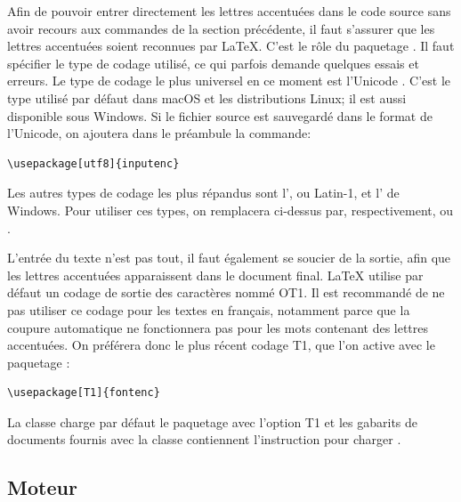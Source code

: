 {Afin de pouvoir entrer directement les lettres accentuées dans le code
source sans avoir recours aux commandes de la section précédente, il
faut s'assurer que les lettres accentuées soient reconnues par
{\LaTeX}. C'est le rôle du paquetage  \citep{inputenc}.
Il faut spécifier le type de codage utilisé, ce qui parfois demande
quelques essais et erreurs. Le type de codage le plus universel en ce
moment est l'Unicode \citep{Unicode:5.0}. C'est le type utilisé par
défaut dans macOS et les distributions Linux; il est aussi
disponible sous Windows. Si le fichier source est sauvegardé dans le
format %
de l'Unicode, on ajoutera dans le préambule la commande:
\begin{lstlisting}
\usepackage[utf8]{inputenc}
\end{lstlisting}

Les autres types de codage les plus répandus sont
l', ou
Latin-1, et l'
de Windows. Pour utiliser ces types, on remplacera 
ci-dessus par, respectivement,  ou .

L'entrée du texte n'est pas tout, il faut également se soucier de la
sortie, afin que les lettres accentuées apparaissent dans le document
final. {\LaTeX} utilise par défaut un codage de sortie des caractères
nommé OT1. Il est recommandé de ne pas utiliser ce codage pour les
textes en français, notamment parce que la coupure automatique ne
fonctionnera pas pour les mots contenant des lettres accentuées. On
préférera donc le plus récent codage T1, que l'on active avec le
paquetage  \citep{fontenc}:
\begin{lstlisting}
\usepackage[T1]{fontenc}
\end{lstlisting}

La classe  charge par défaut le paquetage 
avec l'option T1 et les gabarits de documents fournis avec la classe
contiennent l'instruction pour charger .

\subsection[Moteur XeTeX]{Moteur \XeTeX}
\label{sec:bases:francais:xetex}

}
